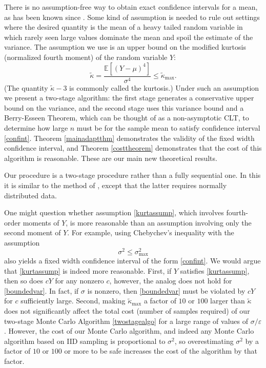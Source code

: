 \documentclass[graybox]{svmult}
\newcommand\e{\mathbb{E}}
\newcommand{\tkappa}{\tilde{\kappa}}
\begin{document}
There is no assumption-free way to obtain exact confidence intervals for a mean,
as has been known since \cite{BahSav56}. Some kind of assumption is needed to rule out settings where the desired quantity is the
mean of a heavy tailed random variable in which
rarely seen large values dominate the mean and spoil the estimate of the variance.
The assumption we use is an upper bound on
the modified kurtosis (normalized fourth moment) of the
random variable $Y$:
\begin{equation} \label{kurtassump}
\tkappa = \frac{\e[(Y-\mu)^4]}{\sigma^4} \le \tkappa_{\max}.
\end{equation}
(The quantity $\tkappa-3$ is commonly called the kurtosis.)  Under such an assumption we present
a two-stage algorithm: the first stage generates
a conservative upper bound on the variance, and the second stage
uses this variance bound and a Berry-Esseen Theorem, which can be thought of as a non-asymptotic CLT, to determine how large $n$ must be for the sample mean to satisfy confidence interval \eqref{confint}.  Theorem \ref{mainadaptthm} demonstrates the validity of the fixed width confidence interval, and Theorem \ref{costtheorem} demonstrates that the cost of this algorithm is reasonable.  These are our main new theoretical results.

Our procedure is a two-stage procedure
rather than a fully sequential one.  In
this it is similar to the method of
\cite{Stei1945a,Stei1949a}, except that
the latter requires normally distributed
data.

One might question whether assumption \eqref{kurtassump}, which involves fourth-order moments of $Y$, is more reasonable than an assumption involving only the second moment of $Y$.  For example, using Chebychev's inequality with the assumption 
\begin{equation} \label{boundedvar}
\sigma^2 \le \sigma^2_{\max}
\end{equation}
also yields a fixed width confidence interval of the form \eqref{confint}.  We would argue that \eqref{kurtassump} is indeed more reasonable.  First, if $Y$ satisfies \eqref{kurtassump}, then so does $cY$ for any nonzero $c$, however, the analog does not hold for \eqref{boundedvar}.  In fact, if $\sigma$ is nonzero, then \eqref{boundedvar} must be violated by $cY$ for $c$ sufficiently large.  Second, making $\tkappa_{\max}$ a factor of $10$ or $100$ larger than $\tkappa$ does not significantly affect the total cost (number of samples required) of our two-stage Monte Carlo Algorithm \ref{twostagealgo} for a large range of values of $\sigma/\varepsilon$.  However, the cost of our Monte Carlo algorithm, and indeed any Monte Carlo algorithm based on IID sampling is proportional to $\sigma^2$, so overestimating $\sigma^2$ by a factor of $10$ or $100$ or more to be safe increases the cost of the algorithm by that factor. 
\end{document}
